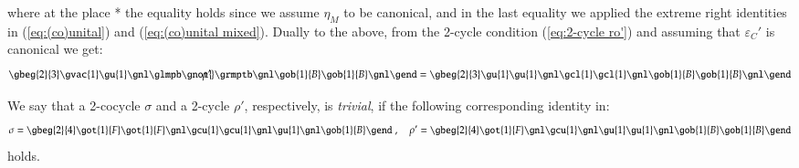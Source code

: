 \documentclass[a4paper, 12pt]{article}
\renewcommand{\_}[1]{\mbox{$_{\left( #1 \right)}$}}
\theoremstyle{plain}
\newcommand{\Epsilon}{\varepsilon}
\newcommand{\eqlabel}[1]{\label{eq:#1}}
\newcommand{\equref}[1]{(\ref{eq:#1})}
\begin{document}
where at the place * the equality holds since we assume $\eta_M$ to be canonical, and in the last equality we applied the extreme right identities in \equref{(co)unital} and \equref{(co)unital mixed}. 
Dually to the above, from the 2-cycle condition \equref{2-cycle ro'} and assuming that $\Epsilon_C'$ is canonical we get: 
\begin{equation} \eqlabel{unit to ro'}
\gbeg{2}{3}
\gvac{1} \gu{1} \gnl
\glmpb \gnot{\hspace{-0,34cm}\rho'} \grmptb \gnl
\gob{1}{B} \gob{1}{B} \gnl
\gend=
\gbeg{2}{3}
\gu{1} \gu{1} \gnl
\gcl{1} \gcl{1} \gnl
\gob{1}{B} \gob{1}{B} \gnl
\gend
\end{equation}


\medskip


We say that a 2-cocycle $\sigma$ and a 2-cycle $\rho'$, respectively, is {\em trivial}, if the following corresponding identity in:
$$\sigma=
\gbeg{2}{4}
\got{1}{F} \got{1}{F} \gnl
\gcu{1} \gcu{1} \gnl
\gu{1} \gnl
\gob{1}{B}
\gend \hspace{0,1cm}, \quad
\rho'=
\gbeg{2}{4}
\got{1}{F} \gnl
\gcu{1} \gnl
\gu{1} \gu{1} \gnl
\gob{1}{B} \gob{1}{B}
\gend 
$$
holds. 


\medskip
\end{document}
